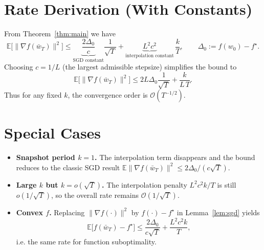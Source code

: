 \documentclass{article}
\newcommand{\E}{\mathbb{E}}
\begin{document}
\section*{Rate Derivation (With Constants)}
From Theorem~\ref{thm:main} we have
\[
    \E\big[\|\nabla f(\bar w_T)\|^2\big]
    \le \underbrace{\frac{2\Delta_0}{c}}_{\text{SGD constant}}\frac{1}{\sqrt{T}}
         +\underbrace{L^2c^2}_{\text{interpolation constant}}\,\frac{k}{T},
\qquad\Delta_0:=f(w_0)-f^\star .
\]
Choosing $c=1/L$ (the largest admissible stepsize) simplifies the bound to
\[
    \E\big[\|\nabla f(\bar w_T)\|^2\big]
    \le 2L\Delta_0\frac{1}{\sqrt{T}}+ \frac{k}{L\,T}.
\]
Thus for any fixed $k$, the convergence order is $\mathcal{O}(T^{-1/2})$.

\section*{Special Cases}
\begin{itemize}
    \item \textbf{Snapshot period $k=1$.} The interpolation term disappears and the bound reduces to the classic SGD result $\E\|\nabla f(\bar w_T)\|^2\le 2\Delta_0/(c\sqrt{T})$.
    \item \textbf{Large $k$ but $k=o(\sqrt{T})$.} The interpolation penalty $L^2c^2k/T$ is still $o(1/\sqrt{T})$, so the overall rate remains $\mathcal{O}(1/\sqrt{T})$.
    \item \textbf{Convex $f$.} Replacing $\|\nabla f(\cdot)\|^2$ by $f(\cdot)-f^\star$ in Lemma~\ref{lem:sgd} yields
    \[
        \E\big[f(\bar w_T)-f^\star\big]\le \frac{2\Delta_0}{c\sqrt{T}}+\frac{L^2c^2k}{T},
    \]
    i.e. the same rate for function suboptimality.
\end{itemize}
\end{document}
